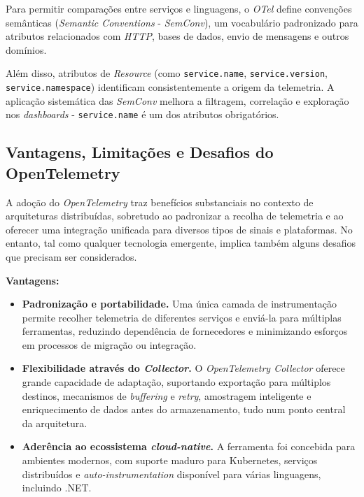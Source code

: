 Para permitir comparações entre serviços e linguagens, o \textit{OTel} define convenções semânticas (\textit{Semantic Conventions} - \textit{SemConv}), um vocabulário padronizado para atributos relacionados com \textit{HTTP}, bases de dados, envio de mensagens e outros domínios. 

Além disso, atributos de \textit{Resource} (como \texttt{service.name}, \texttt{service.version}, \texttt{service.namespace}) identificam consistentemente a origem da telemetria. A aplicação sistemática das \textit{SemConv} melhora a filtragem, correlação e exploração nos \textit{dashboards} - \texttt{service.name} é um dos atributos obrigatórios.


\subsection{Vantagens, Limitações e Desafios do OpenTelemetry}

A adoção do \textit{OpenTelemetry} traz benefícios substanciais no contexto de arquiteturas distribuídas, sobretudo ao padronizar a recolha de telemetria e ao oferecer uma integração unificada para diversos tipos de sinais e plataformas. No entanto, tal como qualquer tecnologia emergente, implica também alguns desafios que precisam ser considerados.

\textbf{Vantagens:}

\begin{itemize}
    \item \textbf{Padronização e portabilidade.} Uma única camada de instrumentação permite recolher telemetria de diferentes serviços e enviá-la para múltiplas ferramentas, reduzindo dependência de fornecedores e minimizando esforços em processos de migração ou integração.
    
    \item \textbf{Flexibilidade através do \textit{ Collector}.} O \textit{OpenTelemetry Collector} oferece grande capacidade de adaptação, suportando exportação para múltiplos destinos, mecanismos de \textit{buffering} e \textit{retry}, amostragem inteligente e enriquecimento de dados antes do armazenamento, tudo num ponto central da arquitetura.
    
    \item \textbf{Aderência ao ecossistema \textit{cloud-native}.} A ferramenta foi concebida para ambientes modernos, com suporte maduro para Kubernetes, serviços distribuídos e \textit{auto-instrumentation} disponível para várias linguagens, incluindo .NET.
\end{itemize}

